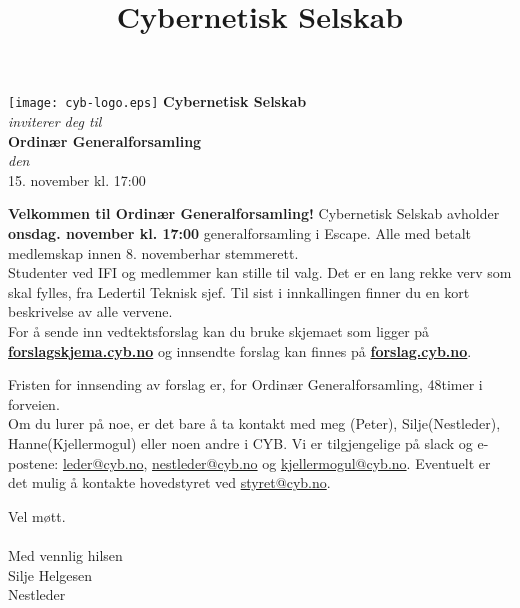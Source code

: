 \documentclass[12pt, norsk, a4paper]{proc}
\title{Cybernetisk Selskab}
\newcommand{\genforsDato}{15. november  kl. 17:00} %
\newcommand{\genforsDag}{onsdag} %
\newcommand{\genforsDatoUkeFoer}{8. november} %
\newcommand{\generalforsamling}{Ordinær Generalforsamling} %
\newcommand{\vedtektsendringerfrist}{48} %
\newcommand{\leder}{Peter} %
\newcommand{\nestlederFornavn}{Silje} %
\newcommand{\utsendingFulltNavn}{Silje Helgesen} %
\newcommand{\utsendingVerv}{Nestleder} %
\newcommand{\mogul}{Hanne} %
\newcommand{\vervoppetilvalgEn}{Leder}
\newcommand{\vervoppetilvalgTo}{Teknisk sjef}
\begin{document}
   \begin{strip}
       \begin{center}
           \texttt{[image: cyb-logo.eps]}
            \Large\textbf{Cybernetisk Selskab}\\
            \textit{inviterer deg til}\\
            \large\textbf{\generalforsamling} \\
            \emph{den} \\
            \large \genforsDato \\
       \end{center}
   \end{strip}

\textbf{Velkommen til \generalforsamling!}
Cybernetisk Selskab avholder \textbf{\genforsDag \space \genforsDato} generalforsamling i Escape. Alle med betalt medlemskap innen \genforsDatoUkeFoer \space har stemmerett.\\

Studenter ved IFI og medlemmer kan stille til valg. Det er en lang rekke verv som skal fylles, fra \vervoppetilvalgEn \space til \vervoppetilvalgTo. Til sist i innkallingen finner du en kort beskrivelse av alle vervene.\\

For å sende inn vedtektsforslag kan du bruke skjemaet som ligger på \textbf{\href{http://forslagskjema.cyb.no/}{forslagskjema.cyb.no}} og innsendte forslag kan finnes på \textbf{\href{http://forslag.cyb.no/}{forslag.cyb.no}}.

Fristen for innsending av forslag er,  for \generalforsamling, \vedtektsendringerfrist \space timer i forveien. \\

Om du lurer på noe, er det bare å ta kontakt med meg (\leder), \nestlederFornavn \space (Nestleder), \mogul \space (Kjellermogul) eller noen andre i CYB. Vi er tilgjengelige på slack og e-postene: \href{mailto:leder@cyb.no}{leder@cyb.no}, \href{mailto:nestleder@cyb.no}{nestleder@cyb.no} og \href{mailto:kjellermogul@cyb.no}{kjellermogul@cyb.no}. Eventuelt er det mulig å kontakte hovedstyret ved \href{mailto:styret@cyb.no}{styret@cyb.no}.

Vel møtt.\\\\
Med vennlig hilsen\\
\utsendingFulltNavn\\
\utsendingVerv
\end{document}
